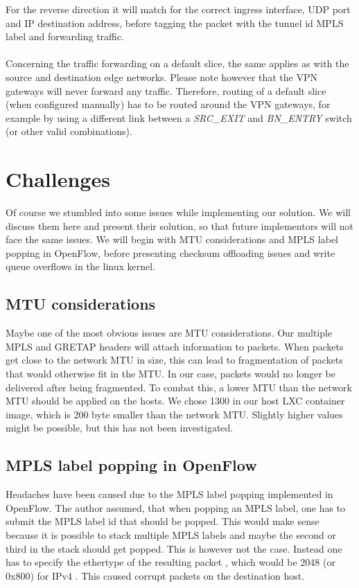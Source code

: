 For the reverse direction it will match for the correct ingress interface, UDP port and IP destination address, before tagging the packet with the tunnel id MPLS label and forwarding traffic.

\paragraph{} Concerning the traffic forwarding on a default slice, the same applies as with the source and destination edge networks. Please note however that the VPN gateways will never forward any traffic. Therefore, routing of a default slice (when configured manually) has to be routed around the VPN gateways, for example by using a different link between a \textit{SRC\_EXIT} and \textit{BN\_ENTRY} switch (or other valid combinations).


\section{Challenges}
Of course we stumbled into some issues while implementing our solution. We will discuss them here and present their solution, so that future implementors will not face the same issues. We will begin with MTU considerations and MPLS label popping in OpenFlow, before presenting checksum offloading issues and write queue overflows in the linux kernel.

\subsection{MTU considerations}
Maybe one of the most obvious issues are MTU considerations. Our multiple MPLS and GRETAP headers will attach information to packets. When packets get close to the network MTU in size, this can lead to fragmentation of packets that would otherwise fit in the MTU. In our case, packets would no longer be delivered after being fragmented. To combat this, a lower MTU than the network MTU should be applied on the hosts. We chose 1300 in our host LXC container image, which is 200 byte smaller than the network MTU. Slightly higher values might be possible, but this has not been investigated.

\subsection{MPLS label popping in OpenFlow}
Headaches have been caused due to the MPLS label popping implemented in OpenFlow. The author assumed, that when popping an MPLS label, one has to submit the MPLS label id that should be popped. This would make sense because it is possible to stack multiple MPLS labels and maybe the second or third in the stack should get popped. This is however not the case. Instead one has to specify the ethertype of the resulting packet \cite{openflow}, which would be 2048 (or 0x800) for IPv4 \cite{rfc7042}. This caused corrupt packets on the destination host.

